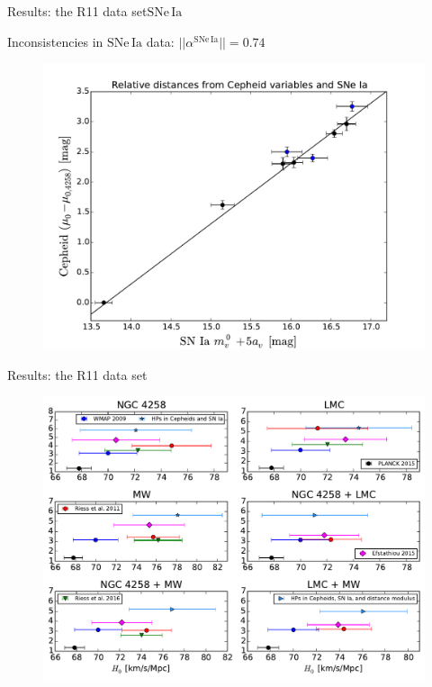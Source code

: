 \documentclass{beamer}
\newcommand{\SNe}{\mathrm{SNe\,Ia}}
\begin{document}
\begin{frame}{Results: the R11 data set}{$\SNe$}
\begin{center}
Inconsistencies in $\SNe$ data: $|| \alpha^{\SNe}|| = 0.74 $
\end{center}
\begin{figure}
\includegraphics[scale=0.45]{../figures/chapter-h0/effective_HP_SNIa.pdf} 
\end{figure}
\end{frame}

\begin{frame}{Results: the R11 data set}
\begin{figure}
\includegraphics[scale=0.5]{../figures/chapter-h0/H0_values_anchor_combination.pdf} 
\end{figure}
\end{frame}
\end{document}

